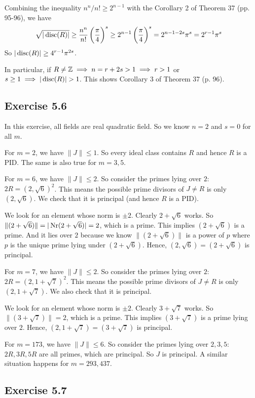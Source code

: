 \documentclass[../Marcus.tex]{subfiles}
\begin{document}
Combining the inequality $n^n/n! \geq 2^{n-1}$ with the Corollary 2 of Theorem 37 (pp. 95-96), we have
$$
\sqrt{|\operatorname{disc}(R)|}
\geq \frac{n^n}{n!} \left(\frac{\pi}{4}\right)^s
\geq 2^{n-1} \left(\frac{\pi}{4}\right)^s
= 2^{n-1-2s} \pi^s
= 2^{r-1} \pi^s
$$
So $|\operatorname{disc}(R)| \geq 4^{r-1}\pi^{2s}$.

In particular, if $R\neq\mathbb{Z} \implies n=r+2s>1 \implies r>1$ or $s\geq 1 \implies |\operatorname{disc}(R)| >1$. This shows Corollary 3 of Theorem 37 (p. 96).

\subsection*{Exercise 5.6}

In this exercise, all fields are real quadratic field. So we know $n=2$ and $s=0$ for all $m$.

For $m=2$, we have $\|J\| \leq 1$. So every ideal class contains $R$ and hence $R$ is a PID. The same is also true for $m=3,5$.

For $m=6$, we have $\|J\| \leq 2$. So consider the primes lying over $2$: $2R=(2,\sqrt{6})^2$. This means the possible prime divisors of $J\neq R$ is only $(2,\sqrt{6})$. We check that it is principal (and hence $R$ is a PID).

We look for an element whose norm is $\pm2$. Clearly $2+\sqrt{6}$ works. So $\|(2+\sqrt{6})\| = |\operatorname{Nr}(2+\sqrt{6})| = 2$, which is a prime. This implies $(2+\sqrt{6})$ is a prime. And it lies over $2$ because we know $\|(2+\sqrt{6})\|$ is a power of $p$ where $p$ is the unique prime lying under $(2+\sqrt{6})$. Hence, $(2,\sqrt{6}) = (2+\sqrt{6})$ is principal.

For $m=7$, we have $\|J\| \leq 2$. So consider the primes lying over $2$: $2R=(2,1+\sqrt{7})^2$. This means the possible prime divisors of $J\neq R$ is only $(2,1+\sqrt{7})$. We also check that it is principal.

We look for an element whose norm is $\pm2$. Clearly $3+\sqrt{7}$ works. So $\|(3+\sqrt{7})\| = 2$, which is a prime. This implies $(3+\sqrt{7})$ is a prime lying over $2$. Hence, $(2,1+\sqrt{7}) = (3+\sqrt{7})$ is principal.

For $m=173$, we have $\|J\| \leq 6$. So consider the primes lying over $2,3,5$: $2R,3R,5R$ are all primes, which are principal. So $J$ is principal. A similar situation happens for $m=293,437$.

\subsection*{Exercise 5.7}
\end{document}
